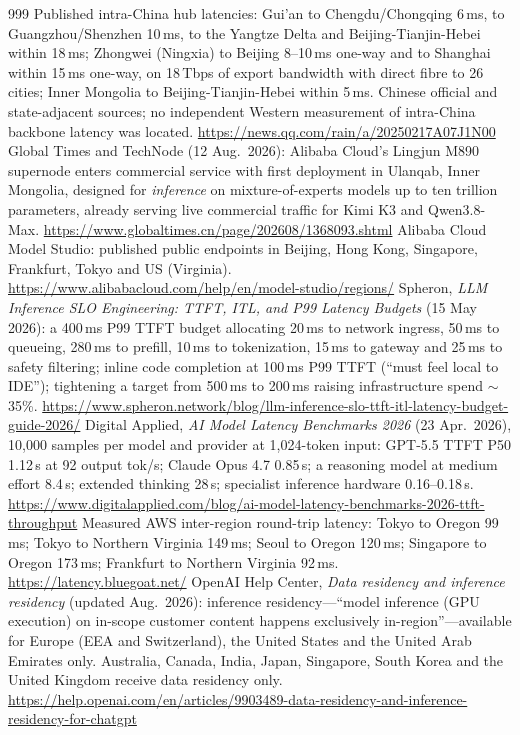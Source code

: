 \begin{thebibliography}{999}
 Published intra-China hub latencies: Gui'an to Chengdu/Chongqing 6\,ms, to Guangzhou/Shenzhen 10\,ms, to the Yangtze Delta and Beijing-Tianjin-Hebei within 18\,ms; Zhongwei (Ningxia) to Beijing 8--10\,ms one-way and to Shanghai within 15\,ms one-way, on 18\,Tbps of export bandwidth with direct fibre to 26 cities; Inner Mongolia to Beijing-Tianjin-Hebei within 5\,ms. Chinese official and state-adjacent sources; no independent Western measurement of intra-China backbone latency was located. \url{https://news.qq.com/rain/a/20250217A07J1N00}
 Global Times and TechNode (12 Aug.\ 2026): Alibaba Cloud's Lingjun M890 supernode enters commercial service with first deployment in Ulanqab, Inner Mongolia, designed for \emph{inference} on mixture-of-experts models up to ten trillion parameters, already serving live commercial traffic for Kimi K3 and Qwen3.8-Max. \url{https://www.globaltimes.cn/page/202608/1368093.shtml}
 Alibaba Cloud Model Studio: published public endpoints in Beijing, Hong Kong, Singapore, Frankfurt, Tokyo and US (Virginia). \url{https://www.alibabacloud.com/help/en/model-studio/regions/}
 Spheron, \emph{LLM Inference SLO Engineering: TTFT, ITL, and P99 Latency Budgets} (15 May 2026): a 400\,ms P99 TTFT budget allocating 20\,ms to network ingress, 50\,ms to queueing, 280\,ms to prefill, 10\,ms to tokenization, 15\,ms to gateway and 25\,ms to safety filtering; inline code completion at 100\,ms P99 TTFT (``must feel local to IDE''); tightening a target from 500\,ms to 200\,ms raising infrastructure spend $\sim$35\%. \url{https://www.spheron.network/blog/llm-inference-slo-ttft-itl-latency-budget-guide-2026/}
 Digital Applied, \emph{AI Model Latency Benchmarks 2026} (23 Apr.\ 2026), 10,000 samples per model and provider at 1,024-token input: GPT-5.5 TTFT P50 1.12\,s at 92 output tok/s; Claude Opus 4.7 0.85\,s; a reasoning model at medium effort 8.4\,s; extended thinking 28\,s; specialist inference hardware 0.16--0.18\,s. \url{https://www.digitalapplied.com/blog/ai-model-latency-benchmarks-2026-ttft-throughput}
 Measured AWS inter-region round-trip latency: Tokyo to Oregon 99\,ms; Tokyo to Northern Virginia 149\,ms; Seoul to Oregon 120\,ms; Singapore to Oregon 173\,ms; Frankfurt to Northern Virginia 92\,ms. \url{https://latency.bluegoat.net/}
 OpenAI Help Center, \emph{Data residency and inference residency} (updated Aug.\ 2026): inference residency---``model inference (GPU execution) on in-scope customer content happens exclusively in-region''---available for Europe (EEA and Switzerland), the United States and the United Arab Emirates only. Australia, Canada, India, Japan, Singapore, South Korea and the United Kingdom receive data residency only. \url{https://help.openai.com/en/articles/9903489-data-residency-and-inference-residency-for-chatgpt}

\end{thebibliography}
